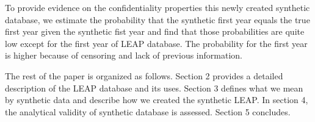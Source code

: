 To provide evidence on the confidentiality properties this newly created  synthetic database, we estimate the probability that the synthetic first year equals the true first year given the synthetic fist year and find that those probabilities are quite low except for the first year of LEAP database. The probability for the first year is higher because of censoring and lack of previous information. 

The rest of the paper is organized as follows. Section 2 provides a detailed description of the LEAP database and its uses. Section 3 defines what we mean by synthetic data and describe how we created the synthetic LEAP. In section 4, the analytical validity of synthetic database is assessed. Section 5 concludes.
